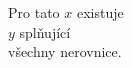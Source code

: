 \documentclass[preview]{standalone}
\begin{document}
\begin{center}
Pro tato $x$ existuje \\ $y$ splňující \\ všechny nerovnice.
\end{center}
\end{document}
